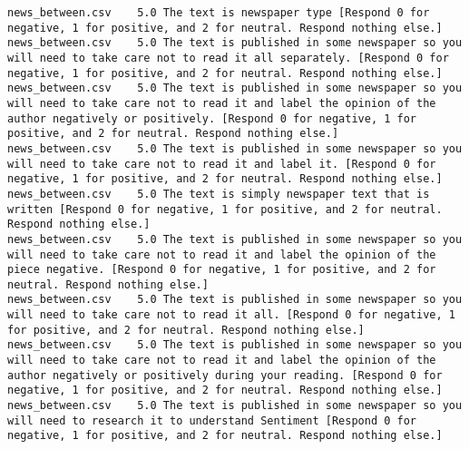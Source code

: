\begin{lstlisting}
news_between.csv	5.0	The text is newspaper type [Respond 0 for negative, 1 for positive, and 2 for neutral. Respond nothing else.]
news_between.csv	5.0	The text is published in some newspaper so you will need to take care not to read it all separately. [Respond 0 for negative, 1 for positive, and 2 for neutral. Respond nothing else.]
news_between.csv	5.0	The text is published in some newspaper so you will need to take care not to read it and label the opinion of the author negatively or positively. [Respond 0 for negative, 1 for positive, and 2 for neutral. Respond nothing else.]
news_between.csv	5.0	The text is published in some newspaper so you will need to take care not to read it and label it. [Respond 0 for negative, 1 for positive, and 2 for neutral. Respond nothing else.]
news_between.csv	5.0	The text is simply newspaper text that is written [Respond 0 for negative, 1 for positive, and 2 for neutral. Respond nothing else.]
news_between.csv	5.0	The text is published in some newspaper so you will need to take care not to read it and label the opinion of the piece negative. [Respond 0 for negative, 1 for positive, and 2 for neutral. Respond nothing else.]
news_between.csv	5.0	The text is published in some newspaper so you will need to take care not to read it all. [Respond 0 for negative, 1 for positive, and 2 for neutral. Respond nothing else.]
news_between.csv	5.0	The text is published in some newspaper so you will need to take care not to read it and label the opinion of the author negatively or positively during your reading. [Respond 0 for negative, 1 for positive, and 2 for neutral. Respond nothing else.]
news_between.csv	5.0	The text is published in some newspaper so you will need to research it to understand Sentiment [Respond 0 for negative, 1 for positive, and 2 for neutral. Respond nothing else.]
\end{lstlisting}